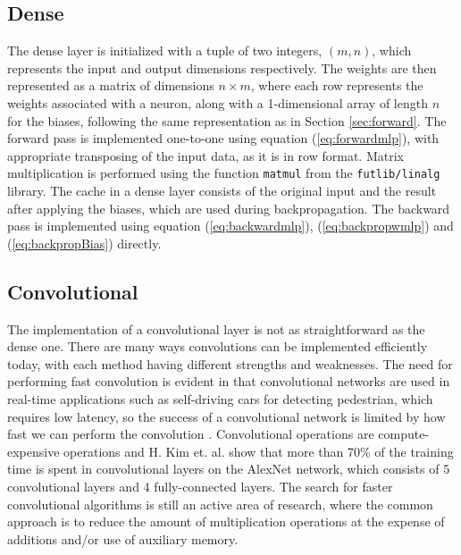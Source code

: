 \subsection{Dense}
The dense layer is initialized with a tuple of two integers, $(m,n)$, which
represents the input and output dimensions respectively. 
The weights are then represented as a matrix of dimensions $n \times m$, where
each row represents the weights associated with a neuron, along with a
1-dimensional array of length $n$ for the biases, following the same
representation as in Section \ref{sec:forward}. 
The forward pass is implemented one-to-one using equation (\ref{eq:forwardmlp}),
with appropriate transposing of the input data, as it is in row format. 
Matrix multiplication is performed using the function \texttt{matmul} from the
\texttt{futlib/linalg} library. 
The cache in a dense layer consists of the original input and the result after
applying the biases, which are used during backpropagation. 
The backward pass is implemented using equation (\ref{eq:backwardmlp}),
(\ref{eq:backpropwmlp}) and (\ref{eq:backpropBias}) directly. 

\subsection{Convolutional}
The implementation of a convolutional layer is not as straightforward as the
dense one. 
There are many ways convolutions can be implemented efficiently today, with each
method having different strengths and weaknesses. 
The need for performing fast convolution is evident in that convolutional
networks are used in real-time applications such as self-driving cars for
detecting pedestrian, which requires low latency, so the success of a
convolutional network is limited by how fast we can perform the convolution
\cite{DBLP:journals/corr/Lavin15b}. 
Convolutional operations are compute-expensive operations and H. Kim et. al.
\cite{Performance} show that more than 70\% of the training time is spent in
convolutional layers on the AlexNet network, which consists of 5 convolutional
layers and 4 fully-connected layers. 
The search for faster convolutional algorithms is still an active area of
research, where the common approach is to reduce the amount of multiplication
operations at the expense of additions and/or use of auxiliary memory. 

